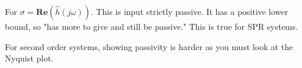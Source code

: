 \documentclass[11pt]{article}
\begin{document}
For $\sigma = \mathbf{Re} (\hat{h}(j\omega))$. This is input strictly passive. It has a positive lower bound, so "has more to give and still be passive." This is true for SPR systems.

For second order systems, showing passivity is harder as you must look at the Nyquist plot.
































\clearpage
% 
\end{document}
